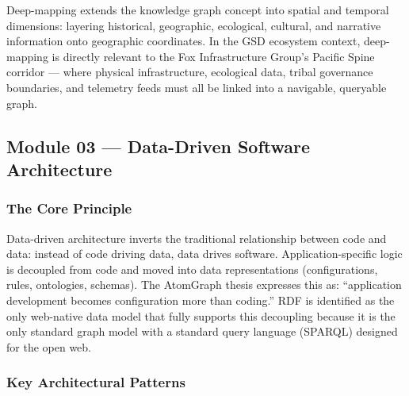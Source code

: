 \documentclass[11pt,letterpaper]{article}
\begin{document}
Deep-mapping extends the knowledge graph concept into spatial and temporal dimensions: layering historical, geographic, ecological, cultural, and narrative information onto geographic coordinates. In the GSD ecosystem context, deep-mapping is directly relevant to the Fox Infrastructure Group's Pacific Spine corridor --- where physical infrastructure, ecological data, tribal governance boundaries, and telemetry feeds must all be linked into a navigable, queryable graph.

\subsection{Module 03 --- Data-Driven Software Architecture}

\subsubsection{The Core Principle}

Data-driven architecture inverts the traditional relationship between code and data: instead of code driving data, data drives software. Application-specific logic is decoupled from code and moved into data representations (configurations, rules, ontologies, schemas). The AtomGraph thesis expresses this as: ``application development becomes configuration more than coding.'' RDF is identified as the only web-native data model that fully supports this decoupling because it is the only standard graph model with a standard query language (SPARQL) designed for the open web.

\subsubsection{Key Architectural Patterns}
\end{document}
